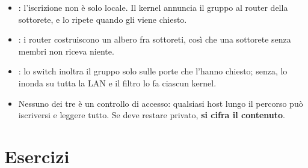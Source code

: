 \begin{itemize}
    \item {}: l'iscrizione non è solo locale. Il kernel annuncia il gruppo al router della sottorete, e lo ripete
          quando gli viene chiesto.
    \item {}: i router costruiscono un albero fra sottoreti, così che una sottorete senza membri non riceva niente.
    \item {}: lo switch inoltra il gruppo solo sulle porte che l'hanno chiesto; senza, lo inonda su tutta
          la LAN e il filtro lo fa ciascun kernel.
    \item Nessuno dei tre è un controllo di accesso: qualsiasi host lungo il percorso può iscriversi e leggere tutto. Se
          deve restare privato, \textbf{si cifra il contenuto}.
\end{itemize}

\section{Esercizi}

